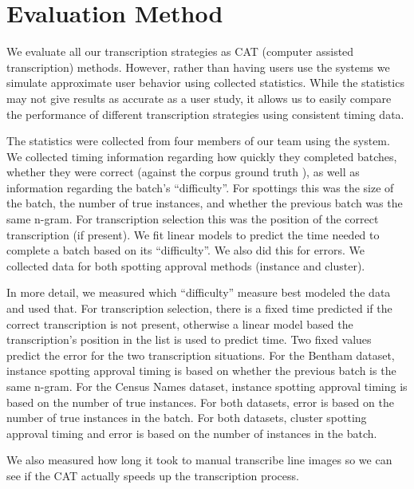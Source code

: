 \documentclass[ms,electronic,twosidetoc,letterpaper,chaptercenter,parttop,lof,lot]{byumsphd}
\begin{document}
\section{Evaluation Method}

We evaluate all our transcription strategies as CAT (computer assisted transcription) methods. However, rather than having users use the systems we simulate approximate user behavior using collected statistics. While the statistics may not give results as accurate as a user study, it allows us to easily compare the performance of different transcription strategies using consistent timing data.

The statistics were collected from four members of our team
using the system. We collected timing information regarding how quickly they completed batches, whether they were correct (against the corpus ground truth 
), as well as information regarding the batch's ``difficulty''. For spottings this was the size of the batch, the number of true instances, and whether the previous batch was the same n-gram. For transcription selection this was the position of the correct transcription (if present). 
We fit linear models to predict the time needed to complete a batch based on its ``difficulty''. We also did this for errors.
We collected data for both spotting approval methods (instance and cluster).

In more detail, we measured which ``difficulty'' measure best modeled the data and used that. For transcription selection, there is a fixed time predicted if the correct transcription is not present, otherwise a linear model based the transcription's position in the list is used to predict time. Two fixed values predict the error for the two transcription situations. 
For the Bentham dataset, instance spotting approval timing is based on whether the previous batch is the same n-gram. For the Census Names dataset, instance spotting approval timing is based on the number of true instances. For both datasets, error is based on the number of true instances in the batch. For both datasets, cluster spotting approval timing and error is based on the number of instances in the batch.

We also measured how long it took to manual transcribe line images so we can see if the CAT actually speeds up the transcription process.
\end{document}
